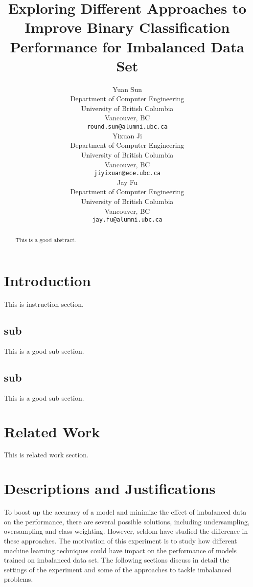 \documentclass{article}
\title{Exploring Different Approaches to Improve Binary Classification Performance for Imbalanced Data Set}
\author{%
  Yuan Sun\\
  Department of Computer Engineering\\
  University of British Columbia\\
  Vancouver, BC\\
  \texttt{round.sun@alumni.ubc.ca}\\
  \And
  Yixuan Ji\\
  Department of Computer Engineering\\
  University of British Columbia\\
  Vancouver, BC\\
  \texttt{jiyixuan@ece.ubc.ca}\\
  \AND
  Jay Fu\\
  Department of Computer Engineering\\
  University of British Columbia\\
  Vancouver, BC\\
  \texttt{jay.fu@alumni.ubc.ca}\\
}
\begin{document}

\maketitle

\begin{abstract}
  This is a good abstract.
\end{abstract}

\section{Introduction}

This is instruction section.

\subsection{sub}

This is a good sub section.

\subsection{sub}

This is a good sub section.

\section{Related Work}
\label{related_work}

This is related work section.

\section{Descriptions and Justifications}
\label{headings}

To boost up the accuracy of a model and minimize the effect of imbalanced data on the performance, there are several possible solutions, including undersampling, oversampling and class weighting. However, seldom have studied the difference in these approaches. The motivation of this experiment is to study how different machine learning techniques could have impact on the performance of models trained on imbalanced data set. The following sections discuss in detail the settings of the experiment and some of the approaches to tackle imbalanced problems.
\end{document}
